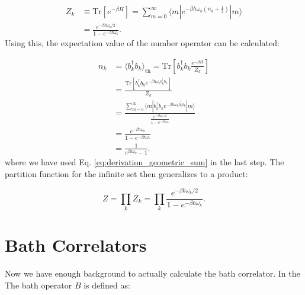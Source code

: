 \begin{align} \label{eq:partition_function}
	Z_k & \equiv \mathrm{Tr}\left[e^{-\beta H}\right] = \sum_{m=0}^{\infty} \langle m | e^{-\beta \hbar \omega_k (n_k + \frac{1}{2})} | m \rangle \\
	    & = \frac{e^{-\beta \hbar \omega_k / 2}}{1 - e^{-\beta \hbar \omega_k}}.
\end{align}
Using this, the expectation value of the number operator can be calculated:

\begin{align} \label{eq:expectation_number_operator}
	n_k & = \langle b_k^{\dagger} b_k \rangle_{\text{th}} = \mathrm{Tr} \left[ b_k^{\dagger} b_k \frac{e^{-\beta H}}{Z_k} \right]                                                             \\
	    & = \frac{\mathrm{Tr} \left[ b_k^{\dagger} b_k e^{-\beta \hbar \omega_k b_k^{\dagger} b_k} \right]}{Z_k}                                                                              \\
	    & = \frac{\sum_{m=0}^{\infty} \langle m|b_k^{\dagger} b_k e^{-\beta \hbar \omega_k b_k^{\dagger} b_k}|m \rangle}{\frac{e^{-\beta \hbar \omega_k / 2}}{1 - e^{-\beta \hbar \omega_k}}} \\
	    & = \frac{e^{-\beta \hbar \omega_k}}{1 - e^{-\beta \hbar \omega_k}}                                                                                                                   \\
	    & = \frac{1}{e^{\beta \hbar \omega_k} - 1}.
\end{align}
where we have used Eq. \eqref{eq:derivation_geometric_sum} in the last step.
The partition function for the infinite set then generalizes to a product:

\begin{equation} \label{eq:generalized_partition_function}
	Z = \prod_k Z_k = \prod_k \frac{e^{-\beta \hbar \omega_k / 2}}{1 - e^{-\beta \hbar \omega_k}}.
\end{equation}

\section{Bath Correlators}
\label{sec:bath_corr_trans_rates}
Now we have enough background to actually calculate the bath correlator.
In the The bath operator \( B \) is defined as:

